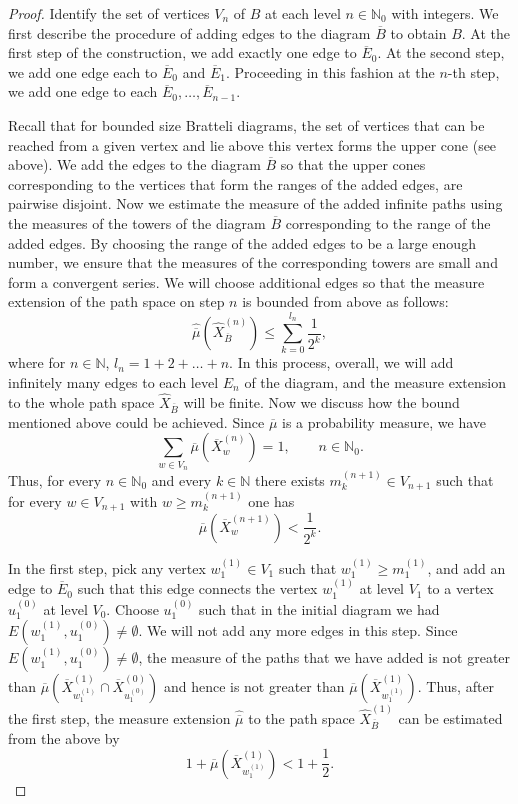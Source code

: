 \documentclass[11pt,reqno]{amsart}
\theoremstyle{definition}
\theoremstyle{remark}
\theoremstyle{plain}
\def\ol{\overline}
\def\ov{\overline}
\def\wh{\widehat}
\newcommand{\N}{\mathbb N}
\numberwithin{equation}{section}
\begin{document}
\begin{proof} Identify the set of vertices $V_n$ of $B$ at each level $n \in \N_0$ with integers. We first describe the procedure of adding edges to the diagram $\ol B$ to obtain $B$. At the first step of the construction, we add exactly one edge to $\ol E_0$. At the second step, we add one edge each to $\ol E_0$ and $\ol E_1$. Proceeding in this fashion at the $n$-th step, we add one edge to each $\ol E_0,\ldots, \ol E_{n-1}$.

Recall that for bounded size Bratteli diagrams, the set of vertices that can be reached from a given vertex and lie above this vertex forms the upper cone (see  above). We add the edges to the diagram $\ov B$ so that the upper cones corresponding to the vertices that form the ranges of the added edges, are pairwise disjoint. Now we estimate the measure of the added infinite paths using the measures of the towers of the diagram $\ov B$ corresponding to the range of the added edges. By choosing the range of the added edges to be a large enough number, we ensure that the measures of the corresponding towers are small and form a convergent series. 
We will choose additional edges so that the measure extension of the path space on step $n$ is bounded from above as follows:
$$
\wh{\ol\mu}(\wh X^{(n)}_{\ol B}) \leq 
\sum_{k = 0}^{l_n} \frac{1}{2^k},
$$
where for $n \in \N$, $l_n = 1 + 2 +\ldots + n$. In this process, overall, we will add infinitely many edges to each level $E_n$ of the diagram, and the measure extension to the whole path space $\wh X_{\ov B}$ will be finite. Now we discuss how the bound mentioned above could be achieved. Since $\ov \mu$ is a  probability measure, we have
$$
\sum_{w \in V_n} \ov \mu (\ov X^{(n)}_w) =1, \qquad n \in \N_0.
$$
Thus, for every $ n \in \N_0$ and every $k\in \mathbb{N}$ 
there exists $m^{(n+1)}_k\in V_{n+1}$ such that
for every $w \in V_{n+1}$ with $w \geq m^{(n+1)}_k$ one has
$$
\ov \mu (\ov X^{(n+1)}_w) < \frac{1}{2^k}.
$$

In the first step, pick any vertex $w^{(1)}_1 \in V_1$ such that $w^{(1)}_1 \geq m_1^{(1)}$, and
add an edge to $\ov E_0$  such that this edge connects the vertex $w^{(1)}_1$ at level $V_1$ to a vertex $u^{(0)}_1$ at level $V_0$. Choose $u^{(0)}_1$ such that in the initial diagram we had $E(w^{(1)}_1, u^{(0)}_1) \neq \emptyset$.
We will not add any more edges in this step. 
Since $E(w^{(1)}_1, u^{(0)}_1) \neq \emptyset$, the measure of the paths that we have added is not greater than $\ov \mu(\ov X^{(1)}_{w^{(1)}_1} \cap \ov X^{(0)}_{u^{(0)}_1})$ and hence is not greater than $\ov \mu(\ov X^{(1)}_{w^{(1)}_1})$.
Thus, after the first step, the measure extension $\wh {\ov \mu}$ to the path space $\wh X^{(1)}_{\ov B}$ can be estimated from the above by
$$
1 + \ov \mu(\ov X^{(1)}_{w^{(1)}_1}) 
< 1 + \frac{1}{2}. 
$$


\end{proof}
\end{document}
